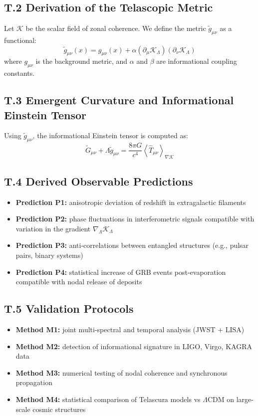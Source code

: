 \documentclass[12pt]{article}
\begin{document}
\subsection*{T.2 Derivation of the Telascopic Metric}
Let $\mathcal{K}$ be the scalar field of zonal coherence. We define the metric $\tilde{g}_{\mu\nu}$ as a functional:
\[
  \tilde{g}_{\mu\nu}(x) = g_{\mu\nu}(x) + \alpha \left(\partial_{\mu} \mathcal{K}_\Lambda\right)\left(\partial_{\nu} \mathcal{K}_\Lambda\right)
\]
where $g_{\mu\nu}$ is the background metric, and $\alpha$ and $\beta$ are informational coupling constants.

\subsection*{T.3 Emergent Curvature and Informational Einstein Tensor}
Using $\tilde{g}_{\mu\nu}$, the informational Einstein tensor is computed as:
\[
  \tilde{G}_{\mu\nu} + \Lambda \tilde{g}_{\mu\nu} = \frac{8 \pi G}{c^4} \left\langle \hat{T}_{\mu\nu} \right\rangle_{\nabla \mathcal{K}}
\]

\subsection*{T.4 Derived Observable Predictions}
\begin{itemize}
  \item \textbf{Prediction P1:} anisotropic deviation of redshift in extragalactic filaments
  \item \textbf{Prediction P2:} phase fluctuations in interferometric signals compatible with variation in the gradient $\nabla_\Lambda \mathcal{K}_\Lambda$
  \item \textbf{Prediction P3:} anti-correlations between entangled structures (e.g., pulsar pairs, binary systems)
  \item \textbf{Prediction P4:} statistical increase of GRB events post-evaporation compatible with nodal release of deposits
\end{itemize}

\subsection*{T.5 Validation Protocols}
\begin{itemize}
  \item \textbf{Method M1:} joint multi-spectral and temporal analysis (JWST + LISA)
  \item \textbf{Method M2:} detection of informational signature in LIGO, Virgo, KAGRA data
  \item \textbf{Method M3:} numerical testing of nodal coherence and synchronous propagation
  \item \textbf{Method M4:} statistical comparison of Telascura models vs $\Lambda$CDM on large-scale cosmic structures
\end{itemize}
\end{document}
